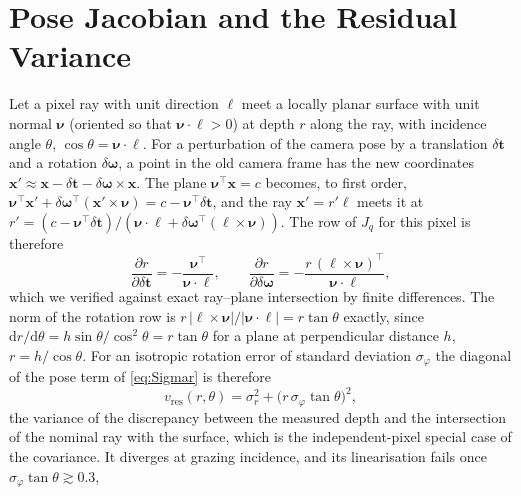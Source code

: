 
\section{Pose Jacobian and the Residual Variance}
\label{app:variance}
Let a pixel ray with unit direction $\boldsymbol\ell$ meet a locally planar surface with unit
normal $\boldsymbol\nu$ (oriented so that $\boldsymbol\nu\cdot\boldsymbol\ell>0$) at depth $r$ along
the ray, with incidence angle $\theta$, $\cos\theta=\boldsymbol\nu\cdot\boldsymbol\ell$. For a perturbation of
the camera pose by a translation $\delta\mathbf{t}$ and a rotation $\delta\boldsymbol\omega$, a point
in the old camera frame has the new coordinates $\mathbf{x}'\approx\mathbf{x}-\delta\mathbf{t}-\delta\boldsymbol\omega\times\mathbf{x}$.
The plane $\boldsymbol\nu^{\top}\mathbf{x}=c$ becomes, to first order,
$\boldsymbol\nu^{\top}\mathbf{x}'+\delta\boldsymbol\omega^{\top}(\mathbf{x}'\times\boldsymbol\nu)=c-\boldsymbol\nu^{\top}\delta\mathbf{t}$, and
the ray $\mathbf{x}'=r'\boldsymbol\ell$ meets it at
$r'=(c-\boldsymbol\nu^{\top}\delta\mathbf{t})/(\boldsymbol\nu\cdot\boldsymbol\ell+\delta\boldsymbol\omega^{\top}(\boldsymbol\ell\times\boldsymbol\nu))$.
The row of $J_q$ for this pixel is therefore
\begin{equation}
  \frac{\partial r}{\partial\delta\mathbf{t}}=-\frac{\boldsymbol\nu^{\top}}{\boldsymbol\nu\cdot\boldsymbol\ell},\qquad
  \frac{\partial r}{\partial\delta\boldsymbol\omega}=-\frac{r\,(\boldsymbol\ell\times\boldsymbol\nu)^{\top}}{\boldsymbol\nu\cdot\boldsymbol\ell},
  \label{eq:Jq}
\end{equation}
which we verified against exact ray--plane intersection by finite differences. The norm of the
rotation row is $r\,|\boldsymbol\ell\times\boldsymbol\nu|/|\boldsymbol\nu\cdot\boldsymbol\ell|=r\tan\theta$ exactly,
since $\mathrm{d}r/\mathrm{d}\theta=h\sin\theta/\cos^{2}\theta=r\tan\theta$ for a plane at
perpendicular distance $h$, $r=h/\cos\theta$. For an isotropic rotation error of standard
deviation $\sigma_\varphi$ the diagonal of the pose term of \eqref{eq:Sigmar} is therefore
\begin{equation}
  v_{\mathrm{res}}(r,\theta)=\sigma_r^{2}+\bigl(r\,\sigma_\varphi\tan\theta\bigr)^{2},
  \label{eq:vres}
\end{equation}
the variance of the discrepancy between the measured depth and the intersection of the nominal
ray with the surface, which is the independent-pixel special case of the covariance. It
diverges at grazing incidence, and its linearisation fails once $\sigma_\varphi\tan\theta\gtrsim0.3$,
